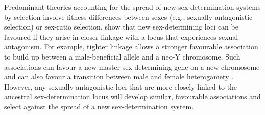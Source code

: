\documentclass[12pt]{article}
\begin{document}


Predominant theories accounting for the spread of new sex-determination systems by selection involve fitness differences between sexes (e.g., sexually antagonistic selection) or sex-ratio selection. 
\citet{vanDoorn:2007eu,vanDoorn:2010hu} show that new sex-determining loci can be favoured if they arise in closer linkage with a locus that experiences sexual antagonism. 
For example, tighter linkage allows a stronger favourable association to build up between a male-beneficial allele and a neo-Y chromosome. 
Such associations can favour a new master sex-determining gene on a new chromosome \citep{vanDoorn:2007eu} and can also favour a transition between male and female heterogamety \citep[e.g., a ZW to XY transition,][]{vanDoorn:2010hu}. 
However, any sexually-antagonistic loci that are more closely linked to the ancestral sex-determination locus will develop similar, favourable associations and select against the spread of a new sex-determination system. 
\end{document}
